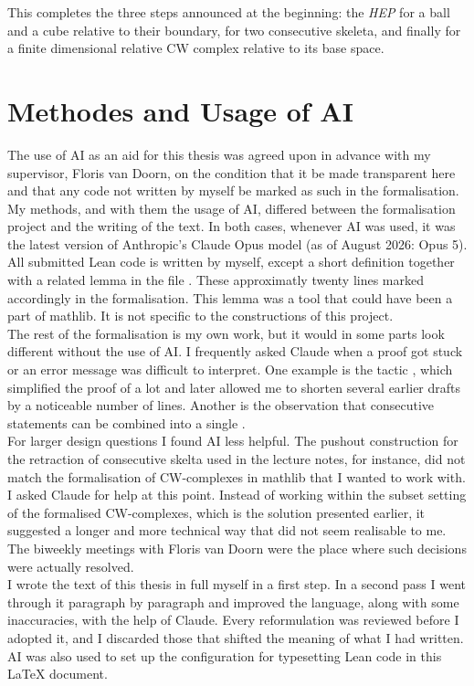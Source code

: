 \documentclass[11pt, a4paper, english]{article}
\theoremstyle{plain}
\theoremstyle{definition}
\theoremstyle{remark}
\numberwithin{equation}{section}
\numberwithin{theorem}{section}
\begin{document}
This completes the three steps announced at the beginning: the \emph{HEP} for a ball and a cube relative to their boundary, for two consecutive skeleta, and finally for a finite dimensional relative CW complex relative to its base space.

\clearpage
\section{Methodes and Usage of AI} \label{section:methodes}
The use of AI as an aid for this thesis was agreed upon in advance with my supervisor, Floris van Doorn, on the condition that it be made transparent here and that any code not written by myself be marked as such in the formalisation. My methods, and with them the usage of AI, differed between the formalisation project and the writing of the text. In both cases, whenever AI was used, it was the latest version of Anthropic's Claude Opus model (as of August 2026: Opus 5).\\
All submitted Lean code is written by myself, except a short definition together with a related lemma in the file . These approximatly twenty lines marked accordingly in the formalisation. This lemma was a tool that could have been a part of mathlib. It is not specific to the constructions of this project.\\
The rest of the formalisation is my own work, but it would in some parts look different without the use of AI. I frequently asked Claude when a proof got stuck or an error message was difficult to interpret. One example is the tactic , which simplified the proof of  a lot and later allowed me to shorten several earlier drafts by a noticeable number of lines. Another is the observation that consecutive  statements can be combined into a single . \\
For larger design questions I found AI less helpful. The pushout construction for the retraction of consecutive skelta used in the lecture notes, for instance, did not match the formalisation of CW-complexes in mathlib that I wanted to work with. I asked Claude for help at this point. Instead of working within the subset setting of the formalised CW-complexes, which is the solution presented earlier, it suggested a longer and more technical way that did not seem realisable to me. The biweekly meetings with Floris van Doorn were the place where such decisions were actually resolved.\\
I wrote the text of this thesis in full myself in a first step. In a second pass I went through it paragraph by paragraph and improved the language, along with some inaccuracies, with the help of Claude. Every reformulation was reviewed before I adopted it, and I discarded those that shifted the meaning of what I had written. AI was also used to set up the configuration for typesetting Lean code in this \LaTeX{} document.
\end{document}

